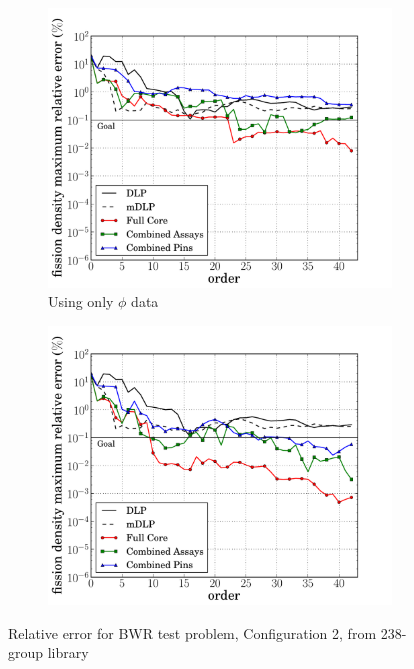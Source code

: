\documentclass[5p,times,twocolumn,10pt]{elsarticle}
\begin{document}
    \begin{figure}[tb]
        \centering
        \begin{subfigure}{0.5\textwidth}
            \centering
            \includegraphics[trim=.1cm .25cm 2.0cm .4cm, clip=true,
            totalheight=0.261\textheight]
            {BWR2_238_energy_basis_comparison_fission-44}
            \caption{Using only $\phi$ data}
            \label{fig:core2-238a}
        \end{subfigure}%
        \begin{subfigure}{0.5\textwidth}
            \centering
            \includegraphics[trim=.1cm .25cm 2.0cm .4cm, clip=true,
            totalheight=0.261\textheight]
            {BWR2_238_partial_energy_basis_comparison_fission-44}
            \label{fig:core2-238b}
        \end{subfigure}
        \caption{Relative error for BWR test problem, Configuration 2, from
            238-group library}
        \label{fig:core2-238}
    \end{figure}
\end{document}
